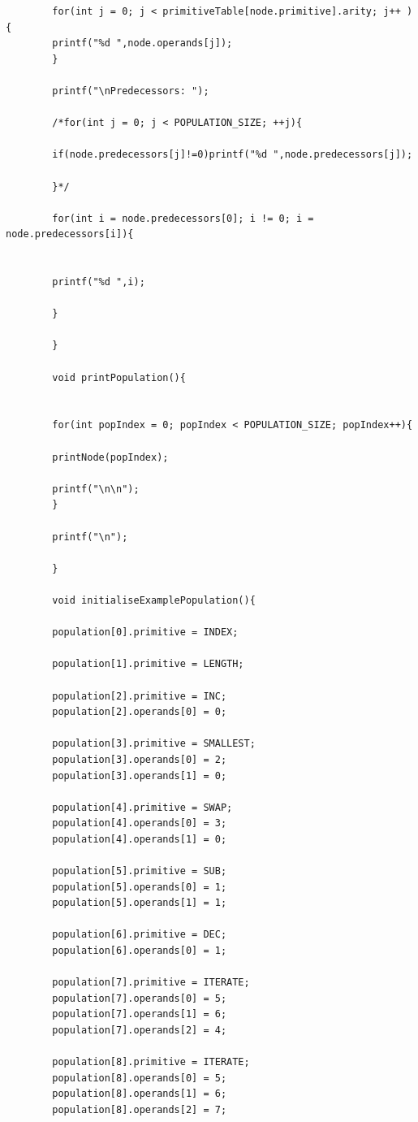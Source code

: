\documentclass{article}
\begin{document}
\begin{lstlisting}
	    for(int j = 0; j < primitiveTable[node.primitive].arity; j++ ){
	    printf("%d ",node.operands[j]);
	    }
	    
	    printf("\nPredecessors: ");
	    
	    /*for(int j = 0; j < POPULATION_SIZE; ++j){
	    
	    if(node.predecessors[j]!=0)printf("%d ",node.predecessors[j]);
	    
	    }*/
	    
	    for(int i = node.predecessors[0]; i != 0; i = node.predecessors[i]){
	    
	    
	    printf("%d ",i);
	    
	    }
	    
	    }
	    
	    void printPopulation(){
	    
	    
	    for(int popIndex = 0; popIndex < POPULATION_SIZE; popIndex++){
	    
	    printNode(popIndex);
	    
	    printf("\n\n");
	    }
	    
	    printf("\n");
	    
	    }
	    
	    void initialiseExamplePopulation(){
	    
	    population[0].primitive = INDEX;
	    
	    population[1].primitive = LENGTH;
	    
	    population[2].primitive = INC;
	    population[2].operands[0] = 0;
	    
	    population[3].primitive = SMALLEST;
	    population[3].operands[0] = 2;
	    population[3].operands[1] = 0;
	    
	    population[4].primitive = SWAP;
	    population[4].operands[0] = 3;
	    population[4].operands[1] = 0;
	    
	    population[5].primitive = SUB;
	    population[5].operands[0] = 1;
	    population[5].operands[1] = 1;
	    
	    population[6].primitive = DEC;
	    population[6].operands[0] = 1;
	    
	    population[7].primitive = ITERATE;
	    population[7].operands[0] = 5;
	    population[7].operands[1] = 6;
	    population[7].operands[2] = 4;
	    
	    population[8].primitive = ITERATE;
	    population[8].operands[0] = 5;
	    population[8].operands[1] = 6;
	    population[8].operands[2] = 7;
	    

\end{lstlisting}
\end{document}

